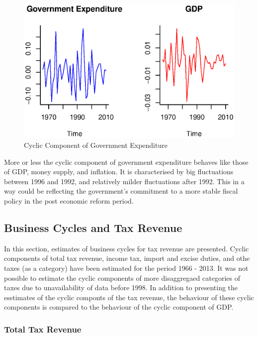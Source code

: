 \documentclass[12pt,a4paper,final]{article}
\begin{document}
\begin{figure}[ht]
\centering
\begin{small}
\caption{Cyclic Component of Government Expenditure}
\end{small}
\includegraphics[scale=0.601]{gov_expend.eps} 
\end{figure}

More or less the cyclic component of government expenditure behaves like those of GDP, money supply, and inflation.  It is characterised by big fluctuations between 1996 and 1992, and relatively milder fluctuations after 1992. This in a way could be reflecting the government's commitment to a more stable fiscal policy in the post economic reform period.

\newpage
\subsection{Business Cycles and Tax Revenue}

In this section, estimates of business cycles for tax revenue are presented.  Cyclic components of total tax revenue, income tax, import and excise duties, and othe taxes (as a category) have been estimated for the period 1966 - 2013. It was not possible to estimate the cyclic components of more disaggregaed categories of taxes due to unavailability of data before 1998. In addition to presenting the esstimates of the cyclic componts of the tax revenue, the behaviour of these cyclic components is compared to the behaviour of the cyclic component of GDP.

\subsubsection{Total Tax Revenue}
\end{document}
